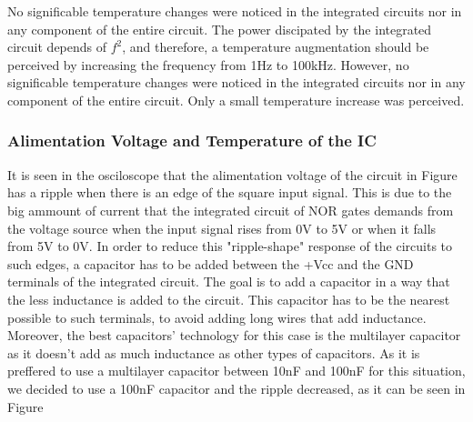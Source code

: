 \documentclass[a4paper,11pt]{report}
\begin{document}
No significable temperature changes were noticed in the integrated circuits nor in any component of the entire circuit.
The power discipated by the integrated circuit depends of $f^{2}$, and therefore, a temperature augmentation should be perceived by increasing the frequency from 1Hz to 100kHz. However, no significable temperature changes were noticed in the integrated circuits nor in any component of the entire circuit. Only a small temperature increase was perceived.


\subsubsection{\color{red}Alimentation Voltage and Temperature of the IC}

It is seen in the osciloscope that the alimentation voltage of the circuit in Figure %
has a ripple when there is an edge of the square input signal. This is due to the big ammount of current that the integrated circuit of NOR gates demands from the voltage source when the input signal rises from 0V to 5V or when it falls from 5V to 0V. 
In order to reduce this "ripple-shape" response of the circuits to such edges, a capacitor has to be added between the +Vcc and the GND terminals of the integrated circuit. The goal is to add a capacitor in a way that the less inductance is added to the circuit. This capacitor has to be the nearest possible to such terminals, to avoid adding long wires that add inductance. Moreover,  the best capacitors' technology for this case is the multilayer capacitor as it doesn't add as much inductance as other types of capacitors. As it is preffered to use a multilayer capacitor between 10nF and 100nF for this situation, we decided to use a 100nF capacitor and the ripple decreased, as it can be seen in Figure %
\end{document}

